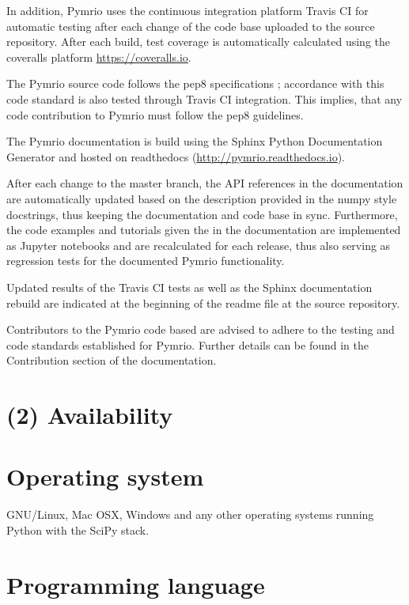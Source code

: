 \documentclass{jors}
\begin{document}
In addition, Pymrio uses the continuous integration platform Travis CI \cite{travis2018} for automatic testing after each change of the code base uploaded to the source repository. After each build, test coverage is automatically calculated using the coveralls platform \url{https://coveralls.io}.

The Pymrio source code follows the pep8 specifications \cite{rossuml2017}; accordance with this code standard is also tested through Travis CI integration. This implies, that any code contribution to Pymrio must follow the pep8 guidelines.

The Pymrio documentation is build using the Sphinx Python Documentation Generator \cite{brandl2018} and hosted on readthedocs (\url{http://pymrio.readthedocs.io}).

After each change to the master branch, the API references in the documentation are automatically updated based on the description provided in the numpy style docstrings, thus keeping the documentation and code base in sync.
Furthermore, the code examples and tutorials given the in the documentation are implemented as Jupyter notebooks \cite{kluyver2016} and are recalculated for each release, thus also serving as regression tests for the documented Pymrio functionality.

Updated results of the Travis CI tests as well as the Sphinx documentation rebuild are indicated at the beginning of the readme file at the source repository. 

Contributors to the Pymrio code based are advised to adhere to the testing and code standards established for Pymrio. Further details can be found in the Contribution section of the documentation. 

\section*{(2) Availability}
\vspace{0.5cm}
\section*{Operating system}

GNU/Linux, Mac OSX, Windows and any other operating systems running Python with the SciPy stack.

\section*{Programming language}
\end{document}

